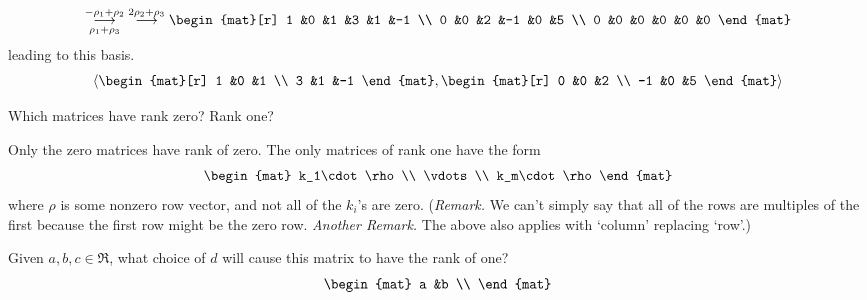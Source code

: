 \begin{exercises}
\begin{answer}
\begin{exparts}
\begin{equation*}
            \grstep[\rho_1+\rho_3]{-\rho_1+\rho_2}
            \;\grstep{2\rho_2+\rho_3}
            \begin{mat}[r]
              1  &0  &1  &3  &1  &-1  \\
              0  &0  &2  &-1 &0  &5   \\
              0  &0  &0  &0  &0  &0
            \end{mat}
          \end{equation*}
          leading to this basis.
          \begin{equation*}
            \sequence{
            \begin{mat}[r]
              1  &0  &1  \\
              3  &1  &-1
            \end{mat},
            \begin{mat}[r]
              0  &0  &2  \\
             -1  &0  &5
            \end{mat}  }
          \end{equation*}
      \end{exparts}   
     \end{answer}
  \item 
    Which matrices have rank zero?
    Rank one?
    \begin{answer}
      Only the zero matrices have rank of zero.
      The only matrices of rank one have the form
      \begin{equation*}
        \begin{mat}
           k_1\cdot \rho  \\
            \vdots  \\
           k_m\cdot \rho
        \end{mat}
      \end{equation*}
      where \( \rho \) is some nonzero row vector, and not all of the 
      \( k_i \)'s are zero.
      (\textit{Remark.}
      We can't simply say that all of the rows are multiples of the first
      because the first row might be the zero row.
      \textit{Another Remark.}
      The above also applies with `column' replacing `row'.)  
    \end{answer}
  \recommended \item
    Given \( a,b,c\in\Re \), what choice of \( d \) will cause this matrix 
    to have the rank of one?
    \begin{equation*}
      \begin{mat}
         a  &b  \\

\end{mat}
\end{equation*}
\end{exercises}
